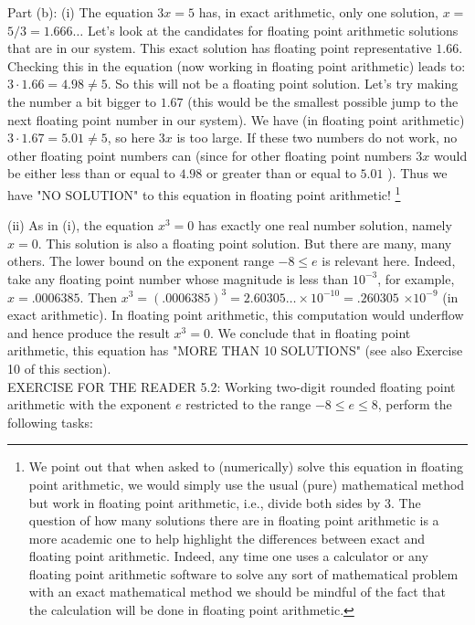 \documentclass[../main.tex]{subfiles}
\begin{document}
Part (b): (i) The equation $3 x=5$ has, in exact arithmetic, only one solution, $x=$ $5 / 3=1.666 \ldots$ Let's look at the candidates for floating point arithmetic solutions that are in our system. This exact solution has floating point representative $1.66$. Checking this in the equation (now working in floating point arithmetic) leads to: $3 \cdot 1.66=4.98 \neq 5$. So this will not be a floating point solution. Let's try making the number a bit bigger to $1.67$ (this would be the smallest possible jump to the next floating point number in our system). We have (in floating point arithmetic) $3 \cdot 1.67=5.01 \neq 5$, so here $3 x$ is too large. If these two numbers do not work, no other floating point numbers can (since for other floating point numbers $3 x$ would be either less than or equal to $4.98$ or greater than or equal to $5.01$ ). Thus we have "NO SOLUTION" to this equation in floating point arithmetic! \footnote{ We point out that when asked to (numerically) solve this equation in floating point arithmetic, we would simply use the usual (pure) mathematical method but work in floating point arithmetic, i.e., divide both sides by 3. The question of how many solutions there are in floating point arithmetic is a more academic one to help highlight the differences between exact and floating point arithmetic. Indeed, any time one uses a calculator or any floating point arithmetic software to solve any sort of mathematical problem with an exact mathematical method we should be mindful of the fact that the calculation will be done in floating point arithmetic.}

(ii) As in (i), the equation $x^{3}=0$ has exactly one real number solution, namely $x=0$. This solution is also a floating point solution. But there are many, many others. The lower bound on the exponent range $-8 \leq e$ is relevant here. Indeed, take any floating point number whose magnitude is less than $10^{-3}$, for example, $x=.0006385$. Then $x^{3}=(.0006385)^{3}=2.60305 \ldots \times 10^{-10}=.260305$ $\times 10^{-9}$ (in exact arithmetic). In floating point arithmetic, this computation would underflow and hence produce the result $x^{3}=0$. We conclude that in floating point arithmetic, this equation has "MORE THAN 10 SOLUTIONS" (see also Exercise 10 of this section).\\

EXERCISE FOR THE READER 5.2: Working two-digit rounded floating point arithmetic with the exponent $e$ restricted to the range $-8 \leq e \leq 8$, perform the following tasks:
\end{document}
